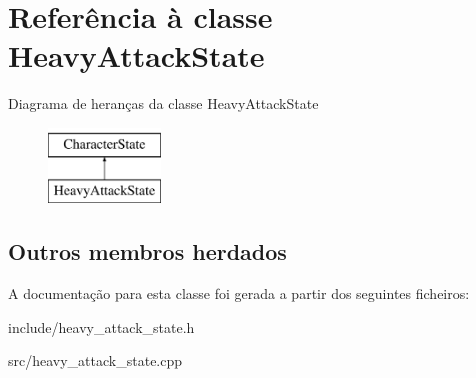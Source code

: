 \hypertarget{classHeavyAttackState}{}\section{Referência à classe Heavy\+Attack\+State}
\label{classHeavyAttackState}
Diagrama de heranças da classe Heavy\+Attack\+State\begin{figure}[H]
\begin{center}
\leavevmode
\includegraphics[height=2.000000cm]{classHeavyAttackState}
\end{center}
\end{figure}
\subsection*{Outros membros herdados}


A documentação para esta classe foi gerada a partir dos seguintes ficheiros\+:\begin{DoxyCompactItemize}
\item 
include/heavy\+\_\+attack\+\_\+state.\+h\item 
src/heavy\+\_\+attack\+\_\+state.\+cpp\end{DoxyCompactItemize}
